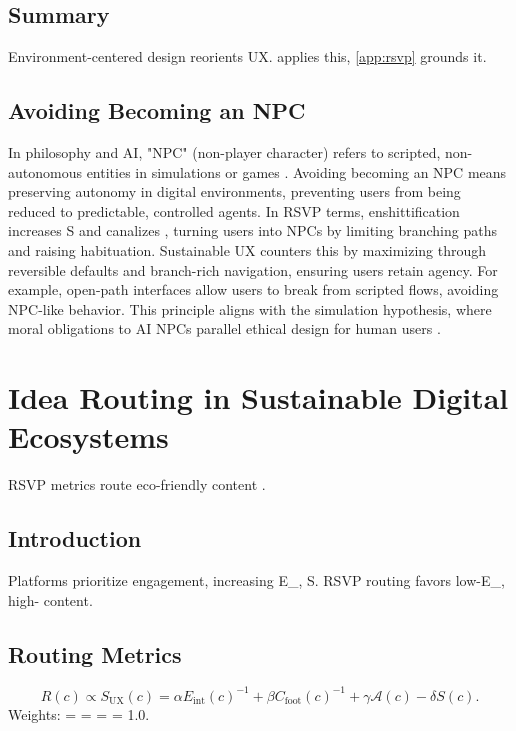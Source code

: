 \documentclass[openany]{book}
\newcommand{\vvec}{\mathbf{v}} %
\newcommand{\Sent}{S} %
\newcommand{\Eint}{E_{\mathrm{int}}} %
\newcommand{\Cfoot}{C_{\mathrm{foot}}} %
\newcommand{\Auton}{\mathcal{A}} %
\newcommand{\SUX}{S_{\mathrm{UX}}} %
\begin{document}
\section{Summary}
Environment-centered design reorients UX.  applies this, \cref{app:rsvp} grounds it.

\section{Avoiding Becoming an NPC}
\label{sec:paradigm-npc}

In philosophy and AI, "NPC" (non-player character) refers to scripted, non-autonomous entities in simulations or games \citep{rosa2024}. Avoiding becoming an NPC means preserving autonomy in digital environments, preventing users from being reduced to predictable, controlled agents. In RSVP terms, enshittification increases \Sent{} and canalizes \vvec{}, turning users into NPCs by limiting branching paths and raising habituation. Sustainable UX counters this by maximizing \Auton{} through reversible defaults and branch-rich navigation, ensuring users retain agency. For example, open-path interfaces allow users to break from scripted flows, avoiding NPC-like behavior. This principle aligns with the simulation hypothesis, where moral obligations to AI NPCs parallel ethical design for human users \citep{rosa2024}.

\chapter{Idea Routing in Sustainable Digital Ecosystems}
\label{ch:routing}

RSVP metrics route eco-friendly content \citep{doctorow2022,designlab2024}.

\section{Introduction}
\label{sec:routing-intro}
Platforms prioritize engagement, increasing \Eint{}, \Sent{}. RSVP routing favors low-\Eint{}, high-\Auton{} content.

\section{Routing Metrics}
\label{sec:routing-metrics}
\begin{equation}
\label{eq:routing}
R(c) \propto \SUX(c) = \alpha \Eint(c)^{-1} + \beta \Cfoot(c)^{-1} + \gamma \Auton(c) - \delta \Sent(c).
\end{equation}
Weights: \alpha = \beta = \gamma = \delta = 1.0.
\end{document}

